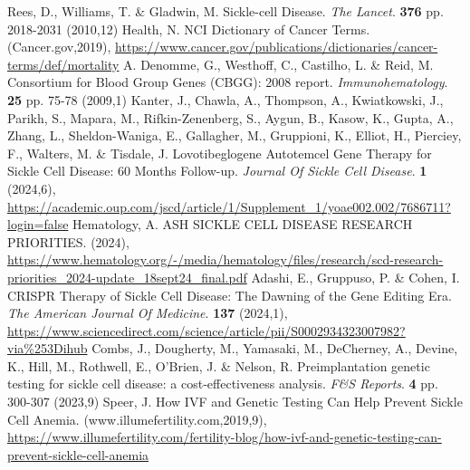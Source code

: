 \documentclass{mva_style}
\begin{document}
\begin{thebibliography}{99}
Rees, D., Williams, T. \& Gladwin, M. Sickle-cell Disease. {\em The Lancet}. \textbf{376} pp. 2018-2031 (2010,12)
Health, N. NCI Dictionary of Cancer Terms. (Cancer.gov,2019), \url{https://www.cancer.gov/publications/dictionaries/cancer-terms/def/mortality}
A. Denomme, G., Westhoff, C., Castilho, L. \& Reid, M. Consortium for Blood Group Genes (CBGG): 2008 report. {\em Immunohematology}. \textbf{25} pp. 75-78 (2009,1)
Kanter, J., Chawla, A., Thompson, A., Kwiatkowski, J., Parikh, S., Mapara, M., Rifkin-Zenenberg, S., Aygun, B., Kasow, K., Gupta, A., Zhang, L., Sheldon-Waniga, E., Gallagher, M., Gruppioni, K., Elliot, H., Pierciey, F., Walters, M. \& Tisdale, J. Lovotibeglogene Autotemcel Gene Therapy for Sickle Cell Disease: 60 Months Follow-up. {\em Journal Of Sickle Cell Disease}. \textbf{1} (2024,6), \url{https://academic.oup.com/jscd/article/1/Supplement_1/yoae002.002/7686711?login=false}
Hematology, A. ASH SICKLE CELL DISEASE RESEARCH PRIORITIES.  (2024), \url{https://www.hematology.org/-/media/hematology/files/research/scd-research-priorities_2024-update_18sept24_final.pdf}
Adashi, E., Gruppuso, P. \& Cohen, I. CRISPR Therapy of Sickle Cell Disease: The Dawning of the Gene Editing Era. {\em The American Journal Of Medicine}. \textbf{137} (2024,1), \url{https://www.sciencedirect.com/science/article/pii/S0002934323007982?via\%253Dihub}
Combs, J., Dougherty, M., Yamasaki, M., DeCherney, A., Devine, K., Hill, M., Rothwell, E., O’Brien, J. \& Nelson, R. Preimplantation genetic testing for sickle cell disease: a cost-effectiveness analysis. {\em F\&S Reports}. \textbf{4} pp. 300-307 (2023,9)
Speer, J. How IVF and Genetic Testing Can Help Prevent Sickle Cell Anemia. (www.illumefertility.com,2019,9), \url{https://www.illumefertility.com/fertility-blog/how-ivf-and-genetic-testing-can-prevent-sickle-cell-anemia}

\end{thebibliography}
\end{document}
